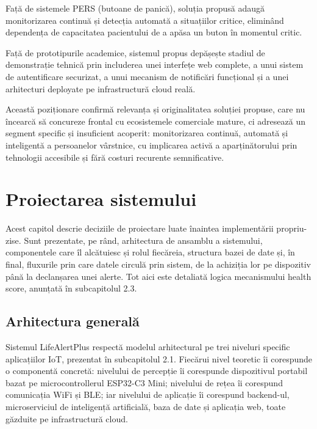 \documentclass[12pt,a4paper]{article}
\begin{document}
Față de sistemele PERS (butoane de panică), soluția propusă adaugă monitorizarea continuă și detecția automată a situațiilor critice, eliminând dependența de capacitatea pacientului de a apăsa un buton în momentul critic.

Față de prototipurile academice, sistemul propus depășește stadiul de demonstrație tehnică prin includerea unei interfețe web complete, a unui sistem de autentificare securizat, a unui mecanism de notificări funcțional și a unei arhitecturi deployate pe infrastructură cloud reală.

Această poziționare confirmă relevanța și originalitatea soluției propuse, care nu încearcă să concureze frontal cu ecosistemele comerciale mature, ci adresează un segment specific și insuficient acoperit: monitorizarea continuă, automată și inteligentă a persoanelor vârstnice, cu implicarea activă a aparținătorului prin tehnologii accesibile și fără costuri recurente semnificative.

\newpage
\section{Proiectarea sistemului}

Acest capitol descrie deciziile de proiectare luate înaintea implementării propriu-zise. Sunt prezentate, pe rând, arhitectura de ansamblu a sistemului, componentele care îl alcătuiesc și rolul fiecăreia, structura bazei de date și, în final, fluxurile prin care datele circulă prin sistem, de la achiziția lor pe dispozitiv până la declanșarea unei alerte. Tot aici este detaliată logica mecanismului health score, anunțată în subcapitolul 2.3.

\subsection{Arhitectura generală}

Sistemul LifeAlertPlus respectă modelul arhitectural pe trei niveluri specific aplicațiilor IoT, prezentat în subcapitolul 2.1. Fiecărui nivel teoretic îi corespunde o componentă concretă: nivelului de percepție îi corespunde dispozitivul portabil bazat pe microcontrollerul ESP32-C3 Mini; nivelului de rețea îi corespund comunicația WiFi și BLE; iar nivelului de aplicație îi corespund backend-ul, microserviciul de inteligență artificială, baza de date și aplicația web, toate găzduite pe infrastructură cloud.
\end{document}
